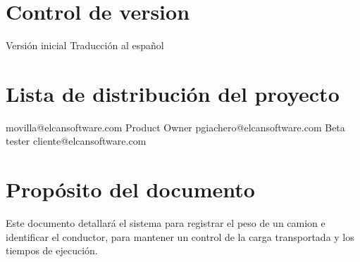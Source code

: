 \section{Control de version}
\begin{elcanversions}
	 {Versión inicial}
	 {Traducción al español}
\end{elcanversions}

\section{Lista de distribución del proyecto}

\begin{elcandistribution}
	 {movilla@elcansoftware.com} {\distribdate} 
	 {Product Owner} {pgiachero@elcansoftware.com} {\distribdate}
	 {Beta tester} {cliente@elcansoftware.com}{\distribdate}
\end{elcandistribution}

\section{Propósito del documento}
Este documento detallar\'a el sistema para registrar el peso de un camion e identificar el conductor, para mantener 
un control de la carga transportada y los tiempos de ejecuci\'on.

